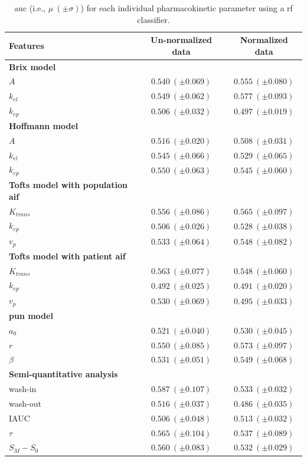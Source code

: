\begin{table}
  \caption{\acs*{auc} (i.e., $\mu \ (\pm \sigma)$) for each individual pharmacokinetic parameter using a \acs*{rf} classifier.}
  \centering
  \begin{tabular}{l c c}
    \toprule
    \textbf{Features} & Un-normalized data & Normalized data \\
    \midrule
    \textbf{Brix model} & & \\
    \quad $A$         & $0.540\ (\pm 0.069)$ & $0.555\ (\pm 0.080)$ \\
    \quad $k_{el}$    & $0.549\ (\pm 0.062)$ & $0.577\ (\pm 0.093)$ \\
    \quad $k_{ep}$    & $0.506\ (\pm 0.032)$ & $0.497\ (\pm 0.019)$ \\
    \textbf{Hoffmann model} & & \\
    \quad $A$         & $0.516\ (\pm 0.020)$ & $0.508\ (\pm 0.031)$ \\
    \quad $k_{el}$    & $0.545\ (\pm 0.066)$ & $0.529\ (\pm 0.065)$ \\
    \quad $k_{ep}$    & $0.550\ (\pm 0.063)$ & $0.545\ (\pm 0.060)$ \\
    \textbf{Tofts model with population \ac{aif}} & & \\
    \quad $K_{trans}$ & $0.556\ (\pm 0.086)$ & $0.565\ (\pm 0.097)$ \\
    \quad $k_{ep}$    & $0.506\ (\pm 0.026)$ & $0.528\ (\pm 0.038)$ \\
    \quad $v_{p}$     & $0.533\ (\pm 0.064)$ & $0.548\ (\pm 0.082)$ \\
    \textbf{Tofts model with patient \ac{aif}} & & \\
    \quad $K_{trans}$ & $0.563\ (\pm 0.077)$ & $0.548\ (\pm 0.060)$ \\
    \quad $k_{ep}$    & $0.492\ (\pm 0.025)$ & $0.491\ (\pm 0.020)$ \\
    \quad $v_{p}$     & $0.530\ (\pm 0.069)$ & $0.495\ (\pm 0.033)$ \\
    \textbf{\ac{pun} model} & & \\
    \quad $a_0$       & $0.521\ (\pm 0.040)$ & $0.530\ (\pm 0.045)$ \\
    \quad $r$         & $0.550\ (\pm 0.085)$ & $0.573\ (\pm 0.097)$ \\
    \quad $\beta$     & $0.531\ (\pm 0.051)$ & $0.549\ (\pm 0.068)$ \\
    \textbf{Semi-quantitative analysis} & & \\
    \quad wash-in     & $0.587\ (\pm 0.107)$ & $0.533\ (\pm 0.032)$ \\
    \quad wash-out    & $0.516\ (\pm 0.037)$ & $0.486\ (\pm 0.035)$ \\
    \quad IAUC        & $0.506\ (\pm 0.048)$ & $0.513\ (\pm 0.032)$ \\
    \quad $\tau$      & $0.565\ (\pm 0.104)$ & $0.537\ (\pm 0.089)$ \\
    \quad $S_M - S_0$ & $0.560\ (\pm 0.083)$ & $0.532\ (\pm 0.029)$ \\
    \bottomrule
  \end{tabular}
  \label{tab:resfeats}
\end{table}

